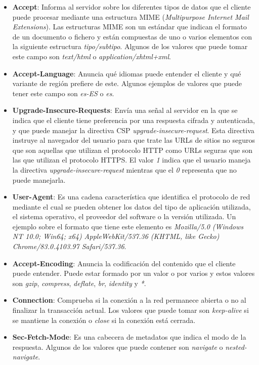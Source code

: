 \begin{itemize}
    \item \textbf{Accept}: Informa al servidor sobre los diferentes tipos de datos que el cliente puede procesar mediante una estructura MIME (\textit{Multipurpose Internet Mail Extensions}). Las estructuras MIME son un estándar que indican el formato de un documento o fichero y están compuestas de uno o varios elementos con la siguiente estructura \textit{tipo/subtipo}. Algunos de los valores que puede tomar este campo son \textit{text/html} o \textit{application/xhtml+xml}.
    \item \textbf{Accept-Language}: Anuncia qué idiomas puede entender el cliente y qué variante de región prefiere de este. Algunos ejemplos de valores que puede tener este campo son \textit{es-ES} o \textit{es}.
    \item \textbf{Upgrade-Insecure-Requests}: Envía una señal al servidor en la que se indica que el cliente tiene preferencia por una respuesta cifrada y autenticada, y que puede manejar la directiva CSP \textit{upgrade-insecure-request}. Esta directiva instruye al navegador del usuario para que trate las URLs de sitios no seguros que son aquellas que utilizan el protocolo HTTP como URLs seguras que son las que utilizan el protocolo HTTPS. El valor \textit{1} indica que el usuario maneja la directiva \textit{upgrade-insecure-request} mientras que el \textit{0} representa que no puede manejarla.
    \item \textbf{User-Agent}: Es una cadena característica que identifica el protocolo de red mediante el cual se pueden obtener los datos del tipo de aplicación utilizada, el sistema operativo, el proveedor del software o la versión utilizada. Un ejemplo sobre el formato que tiene este elemento es \textit{Mozilla/5.0 (Windows NT 10.0; Win64; x64) AppleWebKit/537.36 (KHTML, like Gecko) Chrome/83.0.4103.97 Safari/537.36}. 
    \item \textbf{Accept-Encoding}: Anuncia la codificación del contenido que el cliente puede entender. Puede estar formado por un valor o por varios y estos valores son \textit{gzip}, \textit{compress}, \textit{deflate}, \textit{br}, \textit{identity} y \textit{*}.
    \item \textbf{Connection}: Comprueba si la conexión a la red permanece abierta o no al finalizar la transacción actual. Los valores que puede tomar son \textit{keep-alive} si se mantiene la conexión o \textit{close} si la conexión está cerrada.
    \item \textbf{Sec-Fetch-Mode}: Es una cabecera de metadatos que indica el modo de la respuesta. Algunos de los valores que puede contener son \textit{navigate} o \textit{nested-navigate}.

\end{itemize}
